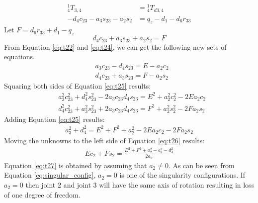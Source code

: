 \begin{equation} \label{eq:t23}
    \begin{aligned}
        {_4^{1}}T_{3,4}                 & ={_4^{1}}T_{d3,4}      \\
        -d_4c_{23} - a_3s_{23} - a_2s_2 & =q_z - d_1 - d_6r_{33}
    \end{aligned}
\end{equation}
Let $F=d_6r_{33}+d_1-q_z$
\begin{equation} \label{eq:t24}
    d_4c_{23} + a_3s_{23} + a_2s_2=F
\end{equation}
From Equation \ref{eq:t22} and \ref{eq:t24}, we can get the following new sets of equations.
\begin{equation} \label{eq:t25}
    \begin{aligned}
         & a_3c_{23} - d_4s_{23}=E-a_2c_2 \\
         & d_4c_{23} + a_3s_{23}=F-a_2s_2
    \end{aligned}
\end{equation}
Squaring both sides of Equation \ref{eq:t25} results:
\begin{equation}
    \begin{aligned}
         & a_3^2c_{23}^2 + d_4^2s_{23}^2-2a_3c_{23}d_4s_{23}=E^2+a_2^2c_2^2-2Ea_2c_2 \\
         & d_4^2c_{23}^2 + a_3^2s_{23}^2+2a_3c_{23}d_4s_{23}=F^2+a_2^2s_2^2-2Fa_2s_2
    \end{aligned}
\end{equation}
Adding Equation \ref{eq:t25} results:
\begin{equation} \label{eq:t26}
    \begin{aligned}
        a_3^2+d_4^2=E^2+F^2+a_2^2-2Ea_2c_2-2Fa_2s_2
    \end{aligned}
\end{equation}
Moving the unknowns to the left side of Equation \ref{eq:t26} results:
\begin{equation} \label{eq:t27}
    \begin{aligned}
        Ec_2+Fs_2=\frac{E^2+F^2+a_2^2-a_3^2-d_4^2}{2a_2}
    \end{aligned}
\end{equation}
Equation \ref{eq:t27} is obtained by assuming that $a_2\neq0$.
As can be seen from Equation \ref{eq:singular_config}, $a_2 = 0$ is one of
the singularity configurations. If $a_2=0$ then joint 2 and joint 3 will have the same
axis of rotation resulting in loss of one degree of freedom.\\
